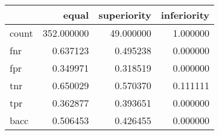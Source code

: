 \begin{tabular}{lrrr}
\toprule
{} &       equal &  superiority &  inferiority \\
\midrule
count &  352.000000 &    49.000000 &     1.000000 \\
fnr   &    0.637123 &     0.495238 &     0.000000 \\
fpr   &    0.349971 &     0.318519 &     0.000000 \\
tnr   &    0.650029 &     0.570370 &     0.111111 \\
tpr   &    0.362877 &     0.393651 &     0.000000 \\
bacc  &    0.506453 &     0.426455 &     0.000000 \\
\bottomrule
\end{tabular}
